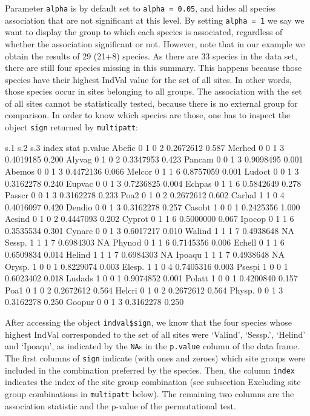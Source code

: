\documentclass[11pt,a4paper]{article}
\begin{document}
Parameter \texttt{alpha} is by default set to \texttt{alpha = 0.05}, and hides all species association that are not significant at this level. By setting \texttt{alpha = 1} we say we want to display the group to which each species is associated, regardless of whether the association significant or not. However, note that in our example we obtain the results of 29 (21+8) species. As there are 33 species in the data set, there are still four species missing in this summary. This happens because those species have their highest IndVal value for the set of all sites. In other words, those species occur in sites belonging to all groups. The association with the set of all sites cannot be statistically tested, because there is no external group for comparison. In order to know which species are those, one has to inspect the object \texttt{sign} returned by \texttt{multipatt}:
\begin{Schunk}
\begin{Soutput}
       s.1 s.2 s.3 index      stat p.value
Abefic   0   1   0     2 0.2672612   0.587
Merhed   0   0   1     3 0.4019185   0.200
Alyvag   0   1   0     2 0.3347953   0.423
Pancam   0   0   1     3 0.9098495   0.001
Abemos   0   0   1     3 0.4472136   0.066
Melcor   0   1   1     6 0.8757059   0.001
Ludoct   0   0   1     3 0.3162278   0.240
Eupvac   0   0   1     3 0.7236825   0.004
Echpas   0   1   1     6 0.5842649   0.278
Passcr   0   0   1     3 0.3162278   0.233
Poa2     0   1   0     2 0.2672612   0.602
Carhal   1   1   0     4 0.4016097   0.420
Dendio   0   0   1     3 0.3162278   0.257
Casobt   1   0   0     1 0.2425356   1.000
Aesind   0   1   0     2 0.4447093   0.202
Cyprot   0   1   1     6 0.5000000   0.067
Ipocop   0   1   1     6 0.3535534   0.301
Cynarc   0   0   1     3 0.6017217   0.010
Walind   1   1   1     7 0.4938648      NA
Sessp.   1   1   1     7 0.6984303      NA
Phynod   0   1   1     6 0.7145356   0.006
Echell   0   1   1     6 0.6509834   0.014
Helind   1   1   1     7 0.6984303      NA
Ipoaqu   1   1   1     7 0.4938648      NA
Orysp.   1   0   0     1 0.8229074   0.003
Elesp.   1   1   0     4 0.7405316   0.003
Psespi   1   0   0     1 0.6023402   0.018
Ludads   1   0   0     1 0.9074852   0.001
Polatt   1   0   0     1 0.4200840   0.157
Poa1     0   1   0     2 0.2672612   0.564
Helcri   0   1   0     2 0.2672612   0.564
Physp.   0   0   1     3 0.3162278   0.250
Goopur   0   0   1     3 0.3162278   0.250
\end{Soutput}
\end{Schunk}
After accessing the object \texttt{indval\$sign}, we know that the four species whose highest IndVal corresponded to the set of all sites were `Valind', `Sessp.', `Helind' and `Ipoaqu', as indicated by the \texttt{NA}s in the \texttt{p.value} column of the data frame. The first columns of \texttt{sign} indicate (with ones and zeroes) which site groups were included in the combination preferred by the species. Then, the column \texttt{index} indicates the index of the site group combination (see subsection Excluding site group combinations in \texttt{multipatt} below). The remaining two columns are the association statistic and the p-value of the permutational test.
\end{document}
